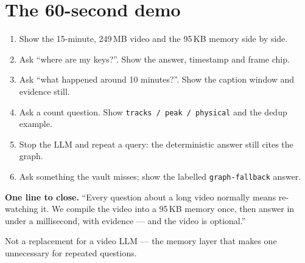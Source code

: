 \documentclass[10pt,a4paper]{article}
\newcommand{\code}[1]{\texttt{\small #1}}
\newcommand{\panel}[1]{%
  \noindent\colorbox{panel}{%
    \begin{minipage}{\dimexpr\linewidth-2\fboxsep\relax}
    \vspace{2pt}#1\vspace{2pt}
    \end{minipage}}%
}
\begin{document}
\vspace{2pt}

\section*{The 60-second demo}

\begin{enumerate}[leftmargin=1.35em,itemsep=1pt]
  \item Show the 15-minute, 249\,MB video and the 95\,KB memory side by side.
  \item Ask ``where are my keys?''. Show the answer, timestamp and frame chip.
  \item Ask ``what happened around 10 minutes?''. Show the caption window and evidence still.
  \item Ask a count question. Show \code{tracks / peak / physical} and the dedup example.
  \item Stop the LLM and repeat a query: the deterministic answer still cites the graph.
  \item Ask something the vault misses; show the labelled \code{graph-fallback} answer.
\end{enumerate}

\vspace{3pt}

\panel{
\textbf{One line to close.} ``Every question about a long video normally means re-watching it. We
compile the video into a 95\,KB memory once, then answer in under a millisecond, with evidence ---
and the video is optional.''
}

\vspace{4pt}

\begin{center}
{\color{muted}\small Not a replacement for a video LLM --- the memory layer that makes one unnecessary
for repeated questions.}
\end{center}
\end{document}
